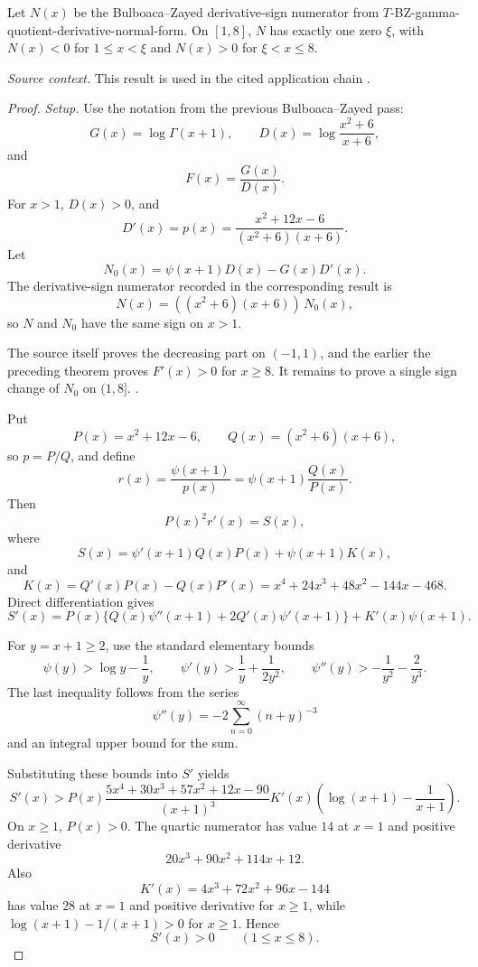 \begin{proposition}
\label{res:bz-gamma-quotient-n-single-crossing-one-eight}
Let \(N(x)\) be the Bulboaca--Zayed derivative-sign numerator from \(T\)-BZ-gamma-quotient-derivative-normal-form. On \([1,8]\), \(N\) has exactly one zero \(\xi\), with \(N(x)<0\) for \(1\le x<\xi\) and \(N(x)>0\) for \(\xi<x\le8\).

\emph{Source context.} This result is used in the cited application chain \cite{app-app-0009-source}.
\end{proposition}
\begin{proof}
\emph{Setup.}
Use the notation from the previous Bulboaca--Zayed pass:
\[
G(x)=\log\Gamma(x+1),\qquad
D(x)=\log\frac{x^2+6}{x+6},
\]
and
\[
F(x)=\frac{G(x)}{D(x)}.
\]
For \(x>1\), \(D(x)>0\), and
\[
D'(x)=p(x)=\frac{x^2+12x-6}{(x^2+6)(x+6)}.
\]
Let
\[
N_0(x)=\psi(x+1)D(x)-G(x)D'(x).
\]
The derivative-sign numerator recorded in
the corresponding result is
\[
N(x)=((x^2+6)(x+6))\,N_0(x),
\]
so \(N\) and \(N_0\) have the same sign on \(x>1\).

The source itself proves the decreasing part on \((-1,1)\), and the earlier
the preceding theorem proves \(F'(x)>0\) for
\(x\ge8\).  It remains to prove a single sign change of \(N_0\) on \((1,8]\). \cite{app-app-0009-source}.

Put
\[
P(x)=x^2+12x-6,\qquad Q(x)=(x^2+6)(x+6),
\]
so \(p=P/Q\), and define
\[
r(x)=\frac{\psi(x+1)}{p(x)}=\psi(x+1)\frac{Q(x)}{P(x)}.
\]
Then
\[
P(x)^2r'(x)=S(x),
\]
where
\[
S(x)=\psi'(x+1)Q(x)P(x)+\psi(x+1)K(x),
\]
and
\[
K(x)=Q'(x)P(x)-Q(x)P'(x)
=x^4+24x^3+48x^2-144x-468.
\]
Direct differentiation gives
\[
S'(x)=P(x)\{Q(x)\psi''(x+1)+2Q'(x)\psi'(x+1)\}+K'(x)\psi(x+1).
\]

For \(y=x+1\ge2\), use the standard elementary bounds
\[
\psi(y)>\log y-\frac1y,\qquad
\psi'(y)>\frac1y+\frac{1}{2y^2},\qquad
\psi''(y)>-\frac1{y^2}-\frac2{y^3}.
\]
The last inequality follows from the series
\[
\psi''(y)=-2\sum_{n=0}^{\infty}(n+y)^{-3}
\]
and an integral upper bound for the sum.

Substituting these bounds into \(S'\) yields
\[
S'(x)>
P(x)\frac{5x^4+30x^3+57x^2+12x-90}{(x+1)^3}
K'(x)\left(\log(x+1)-\frac1{x+1}\right).
\]
On \(x\ge1\), \(P(x)>0\).  The quartic numerator has value \(14\) at \(x=1\)
and positive derivative
\[
20x^3+90x^2+114x+12.
\]
Also
\[
K'(x)=4x^3+72x^2+96x-144
\]
has value \(28\) at \(x=1\) and positive derivative for \(x\ge1\), while
\(\log(x+1)-1/(x+1)>0\) for \(x\ge1\).  Hence
\[
S'(x)>0\qquad(1\le x\le8).
\]


\end{proof}
